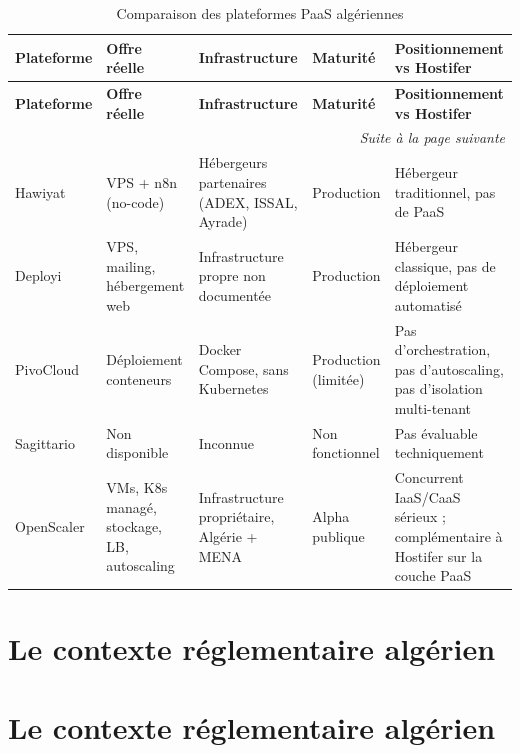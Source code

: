\begin{longtable}{|p{2.3cm}|p{2.5cm}|p{3cm}|p{2.5cm}|p{2.7cm}|}
\caption{Comparaison des plateformes PaaS algériennes}
\label{tab:paas-algeriennes} \\

\hline
\textbf{Plateforme} & \textbf{Offre réelle} & \textbf{Infrastructure} & \textbf{Maturité} & \textbf{Positionnement vs Hostifer} \\
\hline
\endfirsthead

\hline
\textbf{Plateforme} & \textbf{Offre réelle} & \textbf{Infrastructure} & \textbf{Maturité} & \textbf{Positionnement vs Hostifer} \\
\hline
\endhead

\hline
\multicolumn{5}{r|}{\small\textit{Suite à la page suivante}} \\
\endfoot

\hline
\endlastfoot

Hawiyat
  & VPS + n8n (no-code)
  & Hébergeurs partenaires (ADEX, ISSAL, Ayrade)
  & Production
  & Hébergeur traditionnel, pas de PaaS \\
\hline
Deployi
  & VPS, mailing, hébergement web
  & Infrastructure propre non documentée
  & Production
  & Hébergeur classique, pas de déploiement automatisé \\
\hline
PivoCloud
  & Déploiement conteneurs
  & Docker Compose, sans Kubernetes
  & Production (limitée)
  & Pas d'orchestration, pas d'autoscaling, pas d'isolation multi-tenant \\
\hline
Sagittario
  & Non disponible
  & Inconnue
  & Non fonctionnel
  & Pas évaluable techniquement \\
\hline
OpenScaler
  & VMs, K8s managé, stockage, LB, autoscaling
  & Infrastructure propriétaire, Algérie + MENA
  & Alpha publique
  & Concurrent IaaS/CaaS sérieux ; complémentaire à Hostifer sur la couche PaaS \\
\hline

\end{longtable}


\section{Le contexte réglementaire algérien}


\section{Le contexte réglementaire algérien}

